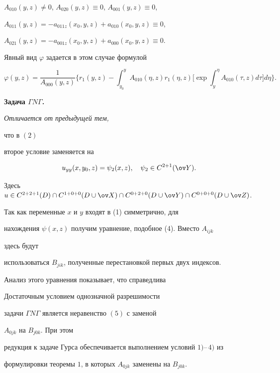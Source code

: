 $A_{010}(y,z)\ne0$, $A_{020}(y,z)\equiv0$, $A_{001}(y,z)\equiv0$, 


$A_{011}(y,z)=-a_{011z}(x_0,y,z)+a_{010}(x_0,y,z)\equiv0$, 


$A_{021}(y,z)=-a_{001z}(x_0,y,z)+a_{000}(x_0,y,z)\equiv0$. 


Явный вид $\varphi$ задается в этом случае формулой 


$$ 


\varphi(y,z)=\frac{1}{A_{000}(y,z)}\bigg\{r_1(y,z) 


-\int^y_{y_0}A_{010}(\eta,z)r_1(\eta,z)\bigg[\exp 


\int^\eta_y A_{010}(\tau,z)d\tau\bigg]d\eta\bigg\}. 


$$ 


 


 


 


{\bf Задача $\varGamma N\varGamma$.} {\it Отличается от предыдущей тем, 


что в $(2)$ 


второе условие заменяется на 


$$ 


u_{yy}(x,y_0,z)=\psi_2(x,z),\quad 


\psi_2\in C^{2+1}(\ov Y). 


$$ 


Здесь $u\in C^{2+2+1}(D) \cap C^{1+0+0}(D\cup\ov X) \cap 


C^{0+2+0}(D\cup\ov Y)\cap C^{0+0+0}(D\cup\ov Z)$.} 


\medskip 


 


 


Так как переменные $x$ и $y$ входят в (1) симметрично, для 


нахождения $\psi(x,z)$ получим уравнение, подобное (4). Вместо $A_{ijk}$ 


здесь будут 


использоваться $B_{jik}$, полученные перестановкой первых двух индексов. 


 


Анализ этого уравнения показывает, что справедлива 


 


\begin{thm} 


Достаточным условием однозначной разрешимости 


задачи $\varGamma N\varGamma$ является неравенство $(5)$ с заменой 


$A_{0jk}$ на $B_{j0k}$. При этом 


редукция к задаче Гурса обеспечивается выполнением условий $1)$--\,$4)$ из 


формулировки теоремы $1$, в которых $A_{0jk}$ заменены на $B_{j0k}$. 


\end{thm} 


